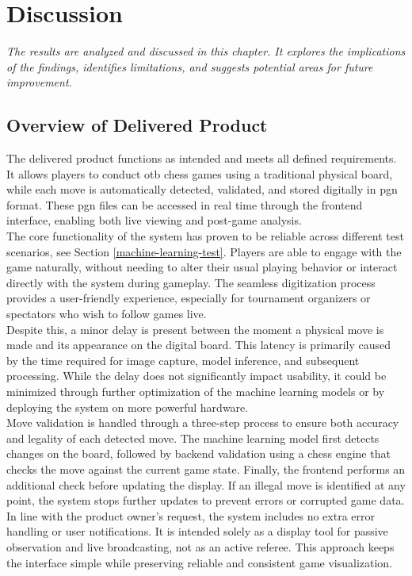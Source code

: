 \chapter{Discussion}

\begin{center}
    \textit{The results are analyzed and discussed in this chapter. It explores the implications of the findings, identifies limitations, and suggests potential areas for future improvement.}
\end{center}

\section{Overview of Delivered Product}
The delivered product functions as intended and meets all defined requirements. It allows players to conduct \gls{otb} chess games using a traditional physical board, while each move is automatically detected, validated, and stored digitally in \gls{pgn} format. These \gls{pgn} files can be accessed in real time through the frontend interface, enabling both live viewing and post-game analysis. \\

The core functionality of the system has proven to be reliable across different test scenarios, see Section \ref{machine-learning-test}. Players are able to engage with the game naturally, without needing to alter their usual playing behavior or interact directly with the system during gameplay. The seamless digitization process provides a user-friendly experience, especially for tournament organizers or spectators who wish to follow games live. \\

Despite this, a minor delay is present between the moment a physical move is made and its appearance on the digital board. This latency is primarily caused by the time required for image capture, model inference, and subsequent processing. While the delay does not significantly impact usability, it could be minimized through further optimization of the machine learning models or by deploying the system on more powerful hardware. \\

Move validation is handled through a three-step process to ensure both accuracy and legality of each detected move. The machine learning model first detects changes on the board, followed by backend validation using a chess engine that checks the move against the current game state. Finally, the frontend performs an additional check before updating the display. If an illegal move is identified at any point, the system stops further updates to prevent errors or corrupted game data. In line with the product owner's request, the system includes no extra error handling or user notifications. It is intended solely as a display tool for passive observation and live broadcasting, not as an active referee. This approach keeps the interface simple while preserving reliable and consistent game visualization.

